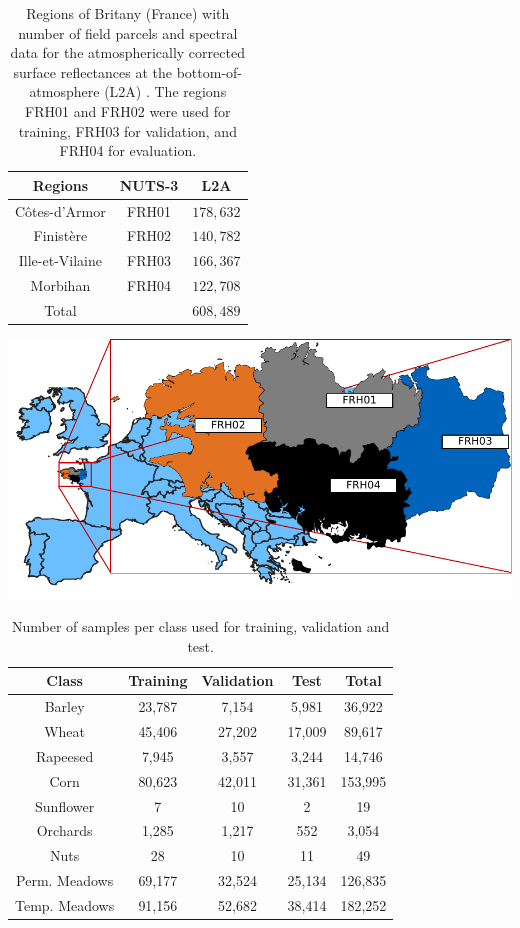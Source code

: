 \documentclass[journal,article,submit,pdftex,moreauthors]{Definitions/mdpi}
\begin{document}
\begin{table}[H]
	\caption{Regions of Britany (France) with number of field parcels and spectral data for the atmospherically corrected surface reflectances at the bottom-of-atmosphere (L2A) \cite{Russwurm2020}. The regions FRH01 and FRH02 were used for training, FRH03 for validation, and FRH04 for evaluation.}
	\begin{minipage}[b]{.4\linewidth}
		\small
		\begin{tabular}{c  c  c} 
			\hline
			Regions     & NUTS-3 & L2A \\ [1ex] 
			\hline
			Côtes-d'Armor   & FRH01  & $178,632$ \\ [1ex]
			Finistère       & FRH02  & $140,782$ \\ [1ex]
			Ille-et-Vilaine & FRH03  & $166,367$ \\ [1ex]
			Morbihan		& FRH04  & $122,708$ \\ [1ex] 
			\hline
			Total			&		 & $608,489$ \\ [1ex] 
			\hline
		\end{tabular}
		\label{Regions}
	\end{minipage}
	\begin{minipage}[b]{.5\linewidth}
		\centering
		\includegraphics[width=0.9\linewidth]{figures/breizhCrops_regions_black.pdf}
	  \end{minipage}
\end{table}
\begin{table}[H]
	\centering
	\caption{Number of samples per class used for training, validation and test.}
	\small
	\begin{tabular}{c c c c c}
		\hline
		Class			& Training		& Validation 	& Test 		& Total \\
		\hline
		Barley			& 23,787		& 7,154			& 5,981		& 36,922 \\
		Wheat			& 45,406		& 27,202		& 17,009	& 89,617 \\
		Rapeesed		& 7,945			& 3,557			& 3,244		& 14,746 \\
		Corn			& 80,623		& 42,011		& 31,361	& 153,995 \\
		Sunflower		& 7				& 10			& 2			& 19 \\
		Orchards		& 1,285			& 1,217			& 552		& 3,054 \\
		Nuts			& 28			& 10			& 11		& 49 \\
		Perm. Meadows	& 69,177		& 32,524		& 25,134	& 126,835 \\
		Temp. Meadows	& 91,156		& 52,682		& 38,414	& 182,252 \\
		\hline
	\end{tabular}
	\label{samples}
\end{table}
\end{document}

